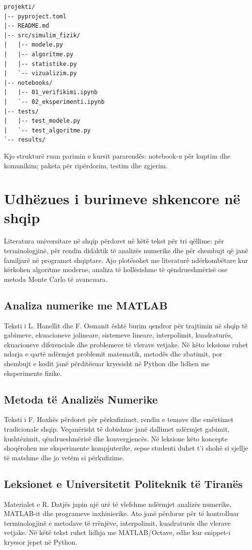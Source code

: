 \documentclass[11pt,oneside,openany]{book}
\begin{document}
\begin{lstlisting}[caption={Struktura e rekomanduar e paketës së studentit.}]
projekti/
|-- pyproject.toml
|-- README.md
|-- src/simulim_fizik/
|   |-- modele.py
|   |-- algoritme.py
|   |-- statistike.py
|   `-- vizualizim.py
|-- notebooks/
|   |-- 01_verifikimi.ipynb
|   `-- 02_eksperimenti.ipynb
|-- tests/
|   |-- test_modele.py
|   `-- test_algoritme.py
`-- results/
\end{lstlisting}

Kjo strukturë ruan parimin e kursit pararendës: notebook-u për kuptim dhe komunikim; paketa për ripërdorim, testim dhe zgjerim.

\section{Udhëzues i burimeve shkencore në shqip}
Literatura universitare në shqip përdoret në këtë tekst për tri qëllime: për terminologjinë, për rendin didaktik të analizës numerike dhe për shembujt që janë familjarë në programet shqiptare. Ajo plotësohet me literaturë ndërkombëtare kur kërkohen algoritme moderne, analiza të hollësishme të qëndrueshmërisë ose metoda Monte Carlo të avancuara.

\subsection{Analiza numerike me MATLAB}
Teksti i L. Hanellit dhe F. Osmanit \cite{hanelli} është burim qendror për trajtimin në shqip të gabimeve, ekuacioneve jolineare, sistemeve lineare, interpolimit, kuadraturës, ekuacioneve diferenciale dhe problemeve të vlerave vetjake. Në këto leksione ruhet ndarja e qartë ndërmjet problemit matematik, metodës dhe zbatimit, por shembujt e kodit janë përditësuar kryesisht në Python dhe lidhen me eksperimente fizike.

\subsection{Metoda të Analizës Numerike}
Teksti i F. Hoxhës \cite{hoxha} përdoret për përkufizimet, rendin e temave dhe emërtimet tradicionale shqip. Veçanërisht të dobishme janë dallimet ndërmjet gabimit, kushtëzimit, qëndrueshmërisë dhe konvergjencës. Në leksione këto koncepte shoqërohen me eksperimente kompjuterike, sepse studenti duhet t'i shohë si sjellje të matshme dhe jo vetëm si përkufizime.

\subsection{Leksionet e Universitetit Politeknik të Tiranës}
Materialet e R. Datjës \cite{datja} japin një urë të vlefshme ndërmjet analizës numerike, MATLAB-it dhe programeve inxhinierike. Ato janë përdorur për të kontrolluar terminologjinë e metodave të rrënjëve, interpolimit, kuadraturës dhe vlerave vetjake. Në këtë tekst ruhet lidhja me MATLAB/Octave, edhe kur snippet-i kryesor jepet në Python.
\end{document}
